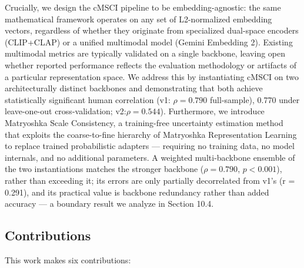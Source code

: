\documentclass[a4paper,fleqn]{cas-sc}
\begin{document}
Crucially, we design the cMSCI pipeline to be embedding-agnostic: the same mathematical framework operates on any set of L2-normalized embedding vectors, regardless of whether they originate from specialized dual-space encoders (CLIP+CLAP) or a unified multimodal model (Gemini Embedding 2). Existing multimodal metrics are typically validated on a single backbone, leaving open whether reported performance reflects the evaluation methodology or artifacts of a particular representation space. We address this by instantiating cMSCI on two architecturally distinct backbones and demonstrating that both achieve statistically significant human correlation (v1: $\rho = 0.790$ full-sample), 0.770 under leave-one-out cross-validation; v2:$\rho = 0.544$). Furthermore, we introduce Matryoshka Scale Consistency, a training-free uncertainty estimation method that exploits the coarse-to-fine hierarchy of Matryoshka Representation Learning \citep{kusupati2022matryoshka} to replace trained probabilistic adapters — requiring no training data, no model internals, and no additional parameters. A weighted multi-backbone ensemble of the two instantiations matches the stronger backbone ($\rho = 0.790$, $p < 0.001$), rather than exceeding it; its errors are only partially decorrelated from v1's (r = 0.291), and its practical value is backbone redundancy rather than added accuracy — a boundary result we analyze in Section 10.4.

\subsection{Contributions}\label{sec:contributions}

This work makes six contributions:
\end{document}
